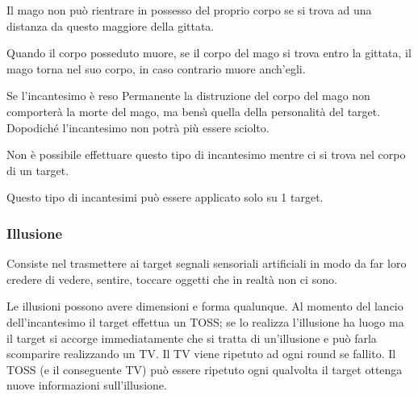 Il mago non pu\`o rientrare in possesso del proprio corpo se
si trova ad una distanza da questo maggiore della gittata. 

Quando il
corpo posseduto muore, se il corpo del mago si trova entro la gittata,
il mago torna nel suo corpo, in caso contrario muore anch'egli. 

 Se
l'incantesimo \`e reso Permanente la distruzione del corpo del mago
non comporter\`a la morte del mago, ma bens\`{\i} quella della personalit\`a
del target.  Dopodich\'e l'incantesimo non potr\`a pi\`u essere
sciolto. 

Non \`e possibile effettuare questo tipo di
incantesimo mentre ci si trova nel corpo di un target. 

Questo tipo di
incantesimi pu\`o essere applicato solo su 1 target. 






\subsubsection{Illusione} 

Consiste
nel trasmettere ai target segnali sensoriali artificiali in modo da far loro
credere di vedere, sentire, toccare oggetti che in realt\`a non ci sono.

Le illusioni possono avere dimensioni e forma qualunque. Al momento del lancio
dell'incantesimo il target effettua un TOSS; se lo realizza l'illusione ha luogo
ma il target si accorge immediatamente che si tratta di un'illusione e pu\`o
farla scomparire realizzando un TV. Il TV viene ripetuto ad ogni round se fallito.
Il TOSS (e il conseguente TV) pu\`o essere ripetuto ogni qualvolta il target
ottenga nuove informazioni sull'illusione. 

